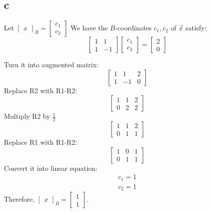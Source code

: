 \documentclass[10pt]{article}
\begin{document}
\subsection*{c}
\noindent Let $ 
    \begin{bmatrix}
        x
    \end{bmatrix}_B =
    \begin{bmatrix}
        c_1 \\
        c_2
    \end{bmatrix}
$
\noindent We have the $B$-coordinates $c_1, c_2$ of $\Vec{x}$ satisfy:
\begin{equation*}
    \begin{bmatrix}
        1 & 1 \\
        1 & -1
    \end{bmatrix}
    \begin{bmatrix}
        c_1 \\
        c_2
    \end{bmatrix} =
    \begin{bmatrix}
        2 \\
        0
    \end{bmatrix}
\end{equation*}

\noindent Turn it into augmented matrix:
\begin{equation*}
    \begin{bmatrix}
        1 & 1 & 2 \\
        1 & -1 & 0
    \end{bmatrix}
\end{equation*}
\noindent Replace R2 with R1-R2:
\begin{equation*}
    \begin{bmatrix}
        1 & 1 & 2 \\
        0 & 2 & 2
    \end{bmatrix}
\end{equation*}
\noindent Multiply R2 by $\frac{1}{2}$
\begin{equation*}
    \begin{bmatrix}
        1 & 1 & 2 \\
        0 & 1 & 1
    \end{bmatrix}
\end{equation*}
\noindent Replace R1 with R1-R2:
\begin{equation*}
    \begin{bmatrix}
        1 & 0 & 1 \\
        0 & 1 & 1
    \end{bmatrix}
\end{equation*}
\noindent Convert it into linear equation:
\begin{align*}
    c_1 = 1 \\
    c_2 = 1
\end{align*}
\noindent Therefore, $
\begin{bmatrix}
        x
\end{bmatrix}_B =
\begin{bmatrix}
    1 \\
    1
\end{bmatrix}
$.
\end{document}

